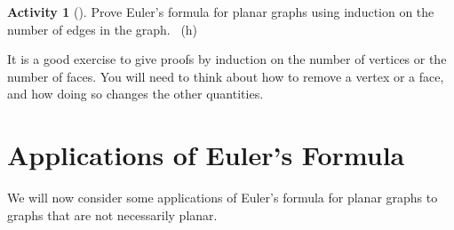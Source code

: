\documentclass[10pt,]{book}
\theoremstyle{plain}
\theoremstyle{definition}
\theoremstyle{definition}
\theoremstyle{definition}
\newtheorem{activity}[project]{Activity}
\numberwithin{equation}{chapter}
\begin{document}
\begin{activity}[]\label{activity-20}
\hypertarget{p-257}{}%
Prove Euler's formula for planar graphs using induction on the number of edges in the graph.%
~{\tiny (h)}\end{activity}
\hypertarget{p-259}{}%
It is a good exercise to give proofs by induction on the number of vertices or the number of faces.  You will need to think about how to remove a vertex or a face, and how doing so changes the other quantities.%
\typeout{************************************************}
\typeout{************************************************}
\section[{Applications of Euler's Formula}]{Applications of Euler's Formula}\label{sec_eulerapps}
\hypertarget{p-260}{}%
We will now consider some applications of Euler's formula for planar graphs to graphs that are not necessarily planar.%
\typeout{************************************************}
\typeout{************************************************}
\end{document}
